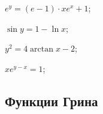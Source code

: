 \begin{enumsols}
		\label{sol:bvp_bvp:nonlinear_hard}
		\item \( e^y = (e - 1) \cdot x e^x + 1 \); \sfill %
		\item \( \sin{y} = 1 - \ln{x} \); \sfill %
		\item \( y^2 = 4 \arctan{x} - 2 \); \sfill %
		\item \( x e^{y - x} = 1 \); \sfill %
	
	\end{enumsols}

\subsection*{Функции Грина}

